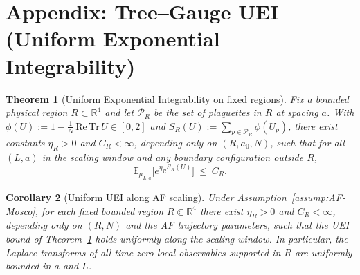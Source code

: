 \documentclass[11pt]{amsart}
\theoremstyle{plain}
\newtheorem{theorem}{Theorem}[section]
\newtheorem{corollary}[theorem]{Corollary}
\theoremstyle{definition}
\theoremstyle{remark}
\begin{document}
\section{Appendix: Tree--Gauge UEI (Uniform Exponential Integrability)}

\begin{theorem}[Uniform Exponential Integrability on fixed regions]\label{thm:uei-fixed-region}
Fix a bounded physical region $R\subset\mathbb{R}^4$ and let $\mathcal{P}_R$ be the set of plaquettes in $R$ at spacing $a$. With $\phi(U):=1-\tfrac{1}{N}\,\mathrm{Re\,Tr}\,U\in[0,2]$ and $S_R(U):=\sum_{p\in\mathcal{P}_R}\phi(U_p)$, there exist constants $\eta_R>0$ and $C_R<\infty$, depending only on $(R,a_0,N)$, such that for all $(L,a)$ in the scaling window and any boundary configuration outside $R$,
\[
  \mathbb{E}_{\mu_{L,a}}\big[e^{\eta_R S_R(U)}\big]\ \le\ C_R.
\]
\end{theorem}
\begin{corollary}[Uniform UEI along AF scaling]\label{cor:uei-af-uniform}
Under Assumption~\ref{assump:AF-Mosco}, for each fixed bounded region $R\Subset\mathbb R^4$ there exist $\eta_R>0$ and $C_R<\infty$, depending only on $(R,N)$ and the AF trajectory parameters, such that the UEI bound of Theorem~\ref{thm:uei-fixed-region} holds uniformly along the scaling window. In particular, the Laplace transforms of all time-zero local observables supported in $R$ are uniformly bounded in $a$ and $L$.
\end{corollary}
\end{document}
